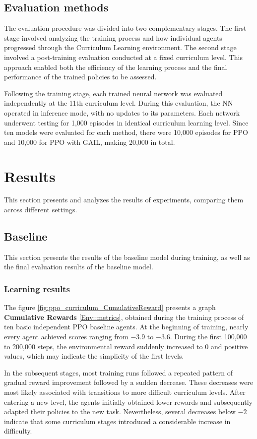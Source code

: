 \subsection{Evaluation methods}
The evaluation procedure was divided into two complementary stages. The first stage involved analyzing the training process and how individual agents progressed through the Curriculum Learning environment. The second stage involved a post-training evaluation conducted at a fixed curriculum level. This approach enabled both the efficiency of the learning process and the final performance of the trained policies to be assessed.


Following the training stage, each trained neural network was evaluated independently at the 11th curriculum level. During this evaluation, the NN operated in inference mode, with no updates to its parameters. Each network underwent testing for 1,000 episodes in identical curriculum learning level. Since ten models were evaluated for each method, there were 10,000 episodes for PPO and 10,000 for PPO with GAIL, making 20,000 in total.



\section{Results}
This section presents and analyzes the results of experiments, comparing them across different settings.
\subsection{Baseline}
This section presents the results of the baseline model during training, as well as the final evaluation results of the baseline model.
\subsubsection{Learning results}
The figure \ref{fig:ppo_curriculum_CumulativeReward} presents a graph \textbf{Cumulative Rewards} \ref{Env::metrics}, obtained during the training process of ten basic independent PPO baseline agents. At the beginning of training, nearly every agent achieved scores ranging from $-3.9$ to $-3.6$. During the first 100,000 to 200,000 steps, the environmental reward suddenly increased to 0 and positive values, which may indicate the simplicity of the first levels. 

In the subsequent stages, most training runs followed a repeated pattern of gradual reward improvement followed by a sudden decrease. These decreases were most likely associated with transitions to more difficult curriculum levels. After entering a new level, the agents initially obtained lower rewards and subsequently adapted their policies to the new task. Nevertheless, several decreases below $-2$ indicate that some curriculum stages introduced a considerable increase in difficulty.



